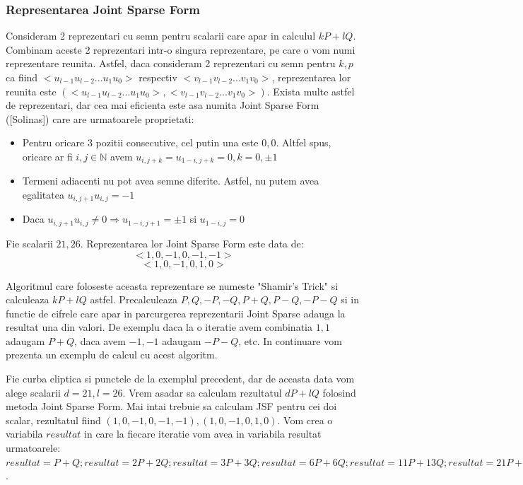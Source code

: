 \subsubsection{Representarea Joint Sparse Form}

\begin{dfn}

Consideram 2 reprezentari cu semn pentru scalarii care apar in calculul $kP + lQ$. Combinam aceste 2 reprezentari intr-o singura reprezentare, pe care o vom numi reprezentare reunita. Astfel, daca consideram 2 reprezentari cu semn pentru $k, p$ ca fiind $<u_{l-1}u_{l-2}...u_1u_0>$ respectiv $<v_{l-1}v_{l-2}...v_1v_0>$, reprezentarea lor reunita este $(<u_{l-1}u_{l-2}...u_1u_0>, <v_{l-1}v_{l-2}...v_1v_0>)$. Exista multe astfel de reprezentari, dar cea mai eficienta este asa numita Joint Sparse Form ([Solinas]) care are urmatoarele proprietati:
\begin{itemize}
\item Pentru oricare 3 pozitii consecutive, cel putin una este $0, 0$. Altfel spus, oricare ar fi $i, j\in\mathbb{N}$ avem $u_{i, j+k} = u_{1-i, j+k} = 0, k=0,\pm 1$
\item Termeni adiacenti nu pot avea semne diferite. Astfel, nu putem avea egalitatea $u_{i, j+1}u_{i, j} = -1$
\item Daca $u_{i, j+1}u_{i, j}\neq 0 \Rightarrow u_{1-i, j+1} = \pm 1$ si $u_{1-i, j}=0$
\end{itemize}
\end{dfn}

\begin{ex}
Fie scalarii $21, 26$. Reprezentarea lor Joint Sparse Form este data de:
$$<1, 0, -1, 0, -1, -1>$$
$$<1, 0, -1, 0, 1, 0>$$
\end{ex}

Algoritmul care foloseste aceasta reprezentare se numeste "Shamir's Trick" si calculeaza $kP + lQ$ astfel. Precalculeaza $P, Q, -P, -Q, P + Q, P - Q, -P - Q$ si in functie de cifrele care apar in parcurgerea reprezentarii Joint Sparse adauga la resultat una din valori. De exemplu daca la o iteratie avem combinatia $1, 1$ adaugam $P + Q$, daca avem $-1, -1$ adaugam $-P - Q$, etc. In continuare vom prezenta un exemplu de calcul cu acest algoritm.

\begin{ex}
Fie curba eliptica si punctele de la exemplul precedent, dar de aceasta data vom alege scalarii $d = 21, l = 26$. Vrem asadar sa calculam rezultatul $dP + lQ$ folosind metoda Joint Sparse Form. Mai intai trebuie sa calculam JSF pentru cei doi scalar, rezultatul fiind $(1, 0, -1, 0, -1, -1), (1, 0, -1, 0, 1, 0)$. Vom crea o variabila $resultat$ in care la fiecare iteratie vom avea in variabila resultat urmatoarele: $resultat = P + Q; resultat = 2P + 2Q; resultat = 3P + 3Q; resultat = 6P + 6Q; resultat = 11P + 13Q; resultat = 21P + 26P = (48, 35)$.

\end{ex}

